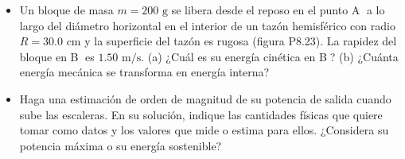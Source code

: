 \documentclass[11pt,a4paper]{article}
\begin{document}
\begin{itemize}
    \item[\textbf{23.}] Un bloque de masa $m = 200 \text{ g}$ se libera desde el reposo en el punto \textcircled{A} a lo largo del diámetro horizontal en el interior de un tazón hemisférico con radio $R = 30.0 \text{ cm}$ y la superficie del tazón es rugosa (figura P8.23). La rapidez del bloque en \textcircled{B} es $1.50 \text{ m/s}$. (a) ¿Cuál es su energía cinética en \textcircled{B}? (b) ¿Cuánta energía mecánica se transforma en energía interna?
    \vspace*{6cm}

    \item[\textbf{24.}] Haga una estimación de orden de magnitud de su potencia de salida cuando sube las escaleras. En su solución, indique las cantidades físicas que quiere tomar como datos y los valores que mide o estima para ellos. ¿Considera su potencia máxima o su energía sostenible?
    \vspace*{6cm}
\end{itemize}

\newpage
\end{document}
